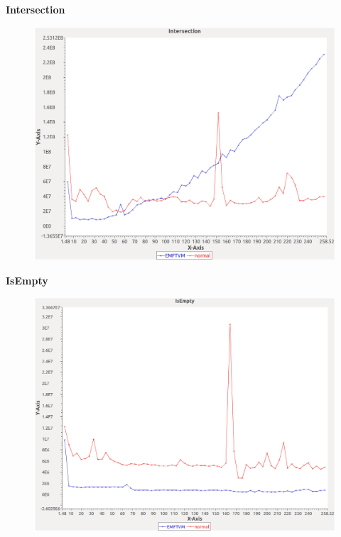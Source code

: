 \noindent\textbf{Intersection}

\begin{figure}[h]
\centering
\includegraphics[width=\textwidth]{graphs/set/Intersection}
\end{figure}
\pagebreak

\noindent\textbf{IsEmpty}

\begin{figure}[h]
\centering
\includegraphics[width=\textwidth]{graphs/set/IsEmpty}
\end{figure}
\pagebreak

